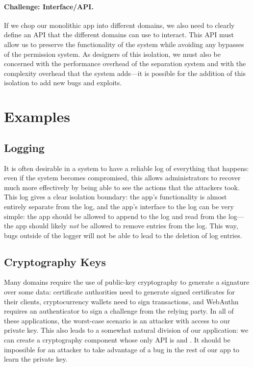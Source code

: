 \paragraph{Challenge: Interface/API.}
If we chop our monolithic app into different domains, we also need to clearly define an API that the different domains can use to interact. This API must allow us to preserve the functionality of the system while avoiding any bypasses of the permission system. As designers of this isolation, we must also be concerned with the performance overhead of the separation system and with the complexity overhead that the system adds---it is possible for the addition of this isolation to add new bugs and exploits.

\section{Examples}
\subsection{Logging}
It is often desirable in a system to have a reliable log of everything that happens: even if the system becomes compromised, this allows administrators to recover much more effectively by being able to see the actions that the attackers took. This log gives a clear isolation boundary: the app's functionality is almost entirely separate from the log, and the app's interface to the log can be very simple: the app should be allowed to append to the log and read from the log---the app should likely \emph{not} be allowed to remove entries from the log. This way, bugs outside of the logger will not be able to lead to the deletion of log entries.

\subsection{Cryptography Keys}
Many domains require the use of public-key cryptography to generate a signature over some data: certificate authorities need to generate signed certificates for their clients, cryptocurrency wallets need to sign transactions, and WebAuthn requires an authenticator to sign a challenge from the relying party. In all of these applications, the worst-case scenario is an attacker with access to our private key. This also leads to a somewhat natural division of our application: we can create a cryptography component whose only API is  and . It should be impossible for an attacker to take advantage of a bug in the rest of our app to learn the private key.

